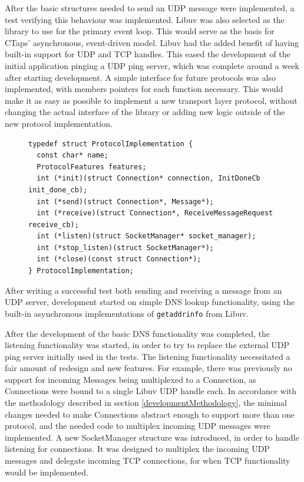 After the basic structures needed to send an UDP message were implemented,
a test verifying this behaviour was implemented. Libuv was also selected
as the library to use for the primary event loop. This would serve as the
basis for CTaps' asynchronous, event-driven model. Libuv had the added benefit
of having built-in support for UDP and TCP handles. This eased the development
of the initial application pinging a UDP ping server, which was complete around
a week after starting development. A simple interface for future protocols was
also implemented, with members  pointers for each function necessary. This would
make it as easy as possible to implement a new transport layer protocol, without
changing the actual interface of the library or adding new logic outside of the
new protocol implementation.

\begin{figure}[H]
\begin{verbatim}
typedef struct ProtocolImplementation {
  const char* name;
  ProtocolFeatures features;
  int (*init)(struct Connection* connection, InitDoneCb init_done_cb);
  int (*send)(struct Connection*, Message*);
  int (*receive)(struct Connection*, ReceiveMessageRequest receive_cb);
  int (*listen)(struct SocketManager* socket_manager);
  int (*stop_listen)(struct SocketManager*);
  int (*close)(const struct Connection*);
} ProtocolImplementation;
\end{verbatim}
\label{The interface used to interact with protocols}
\end{figure}

After writing a successful test both sending
and receiving a message from an UDP server, development started on simple DNS
lookup functionality, using the built-in asynchronous implementations of
\texttt{getaddrinfo} from Libuv.

After the development of the basic DNS functionality was completed, 
the listening functionality was started, in order to try to replace
the external UDP ping server initially used in the tests. The listening
functionality necessitated a fair amount of redesign and new features.
For example, there was previously no support for incoming Messages being
multiplexed to a Connection, as Connections were bound to a single
Libuv UDP handle each. In accordance with the methodology described in
section \ref{developmentMethodology}, the minimal changes needed to
make Connections abstract enough to support more than one protocol,
and the needed code to multiplex incoming UDP messages were implemented.
A new SocketManager structure was introduced, in order to handle listening
for connections. It was designed to multiplex the incoming UDP messages
and delegate incoming TCP connections, for when TCP functionality would
be implemented.

